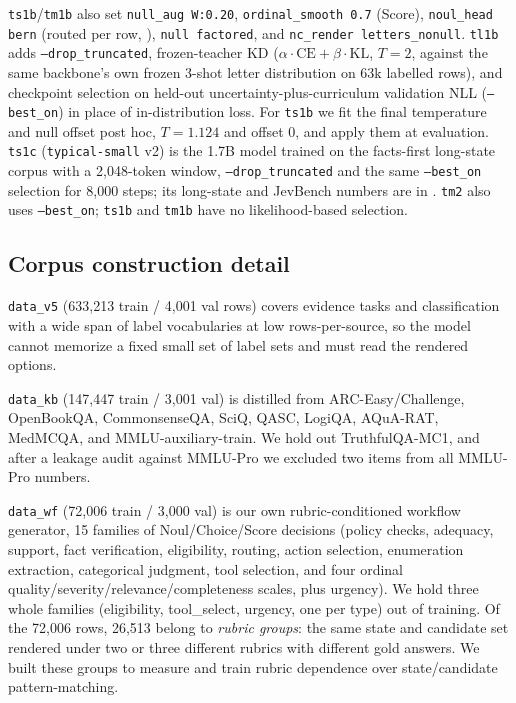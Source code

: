 \texttt{ts1b}/\texttt{tm1b} also set \texttt{null\_aug W:0.20}, \texttt{ordinal\_smooth 0.7} (Score),
\texttt{noul\_head bern} (routed per row, ), \texttt{null factored}, and
\texttt{nc\_render letters\_nonull}. \texttt{tl1b} adds \texttt{--drop\_truncated}, frozen-teacher KD
($\alpha \cdot \mathrm{CE} + \beta \cdot \mathrm{KL}$, $T{=}2$, against the same backbone's own frozen
3-shot letter distribution on 63k labelled rows), and checkpoint selection on held-out
uncertainty-plus-curriculum validation NLL (\texttt{--best\_on}) in place of in-distribution loss. For
\texttt{ts1b} we fit the final temperature and null offset post hoc, $T{=}1.124$ and offset $0$, and
apply them at evaluation.
\texttt{ts1c} (\texttt{typical-small} v2) is the 1.7B model trained on the facts-first long-state corpus
with a 2{,}048-token window, \texttt{--drop\_truncated} and the same \texttt{--best\_on} selection for
8{,}000 steps; its long-state and JevBench numbers are in . \texttt{tm2} also
uses \texttt{--best\_on}; \texttt{ts1b} and \texttt{tm1b} have no likelihood-based selection.

\subsection{Corpus construction detail}
\label{app:corpora}

\texttt{data\_v5} (633{,}213 train / 4{,}001 val rows) covers evidence tasks and classification
with a wide span of label vocabularies at low rows-per-source, so the model cannot memorize a
fixed small set of label sets and must read the rendered options.

\texttt{data\_kb} (147{,}447 train / 3{,}001 val) is distilled from ARC-Easy/Challenge, OpenBookQA,
CommonsenseQA, SciQ, QASC, LogiQA, AQuA-RAT, MedMCQA, and MMLU-auxiliary-train. We hold out
TruthfulQA-MC1, and after a leakage audit against MMLU-Pro we excluded two items from all MMLU-Pro
numbers.

\texttt{data\_wf} (72{,}006 train / 3{,}000 val) is our own rubric-conditioned workflow generator, 15
families of Noul/Choice/Score decisions (policy checks, adequacy, support, fact verification,
eligibility, routing, action selection, enumeration extraction, categorical judgment, tool selection, and
four ordinal quality/severity/relevance/completeness scales, plus urgency). We hold three whole families
(eligibility, tool\_select, urgency, one per type) out of training. Of the 72{,}006 rows, 26{,}513
belong to \emph{rubric groups}: the same state and candidate set rendered under two or three different
rubrics with different gold answers. We built these groups to measure and train rubric dependence over
state/candidate pattern-matching.

